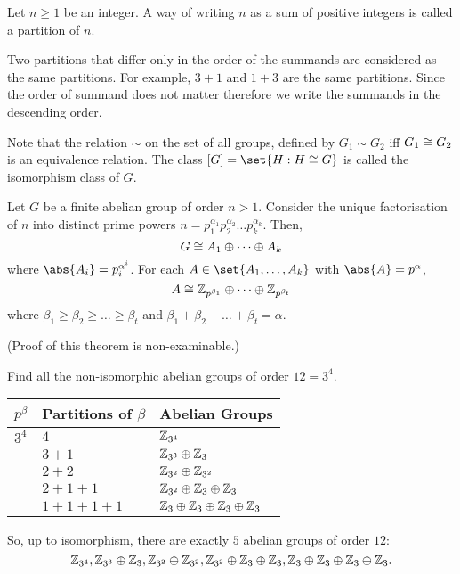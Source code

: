 \documentclass[11pt]{penrose}
\begin{document}
\begin{ndfn}
    Let $n \geq 1$ be an integer. A way of writing $n$ as a sum of positive integers is called a partition of $n$.
\end{ndfn}

Two partitions that differ only in the order of the summands are considered as the same partitions. For example, $3+1$ and $1+3$ are the same partitions. Since the order of summand does not matter therefore we write the summands in the descending order.

Note that the relation $\sim$ on the set of all groups, defined by $G_{1} \sim G_{2}$ iff $G_{1} \mathrel{\cong} G_{2}$ is an equivalence relation. The class $[G] = \set{H : H \isom G}$ is called the isomorphism class of $G$.

\begin{nthm}
    Let $G$ be a finite abelian group of order $n > 1$. Consider the unique factorisation of $n$ into distinct prime powers $n = p_{1}^{\alpha_{1}} p_{2}^{\alpha_{2}} \dots p_{k}^{\alpha_{k}}$. Then,
    \begin{equation*}
        G \mathrel{\cong} A_{1} \oplus \dots \oplus A_{k}
    \end{equation*}
    where $\abs{A_{i}} = p_{i}^{\alpha^{i}}$. For each $A \in \set{A_{1}, \dots, A_{k}}$ with $\abs{A} = p^{\alpha}$,
    \begin{equation*}
        A \mathrel{\cong} \mathbb{Z}_{p^{\beta_{1}}} \oplus \dots \oplus \mathbb{Z}_{p^{\beta_{t}}}
    \end{equation*}
    where $\beta_{1} \geq \beta_{2} \geq \dots \geq \beta_{t}$ and $\beta_{1} + \beta_{2} + \dots + \beta_{t} = \alpha$.
\end{nthm}
(Proof of this theorem is non-examinable.)

\begin{negg}
    Find all the non-isomorphic abelian groups of order $12 = 3^{4}$.
    \begin{center}
        \begin{tabularx}{0.66\textwidth}{p{8mm}XX}
            \toprule
            $p^{\beta}$ & Partitions of $\beta$ & Abelian Groups\\
            \midrule
            $3^{4}$ & $4$ & $\mathbb{Z}_{3^{4}}$ \\
                    & $3+1$ & $\mathbb{Z}_{3^{3}} \oplus \mathbb{Z}_{3}$ \\
                    & $2+2$ & $\mathbb{Z}_{3^{2}} \oplus \mathbb{Z}_{3^{2}}$ \\
                    & $2+1+1$ & $\mathbb{Z}_{3^{2}} \oplus \mathbb{Z}_{3} \oplus \mathbb{Z}_{3}$ \\
                    & $1+1+1+1$ & $\mathbb{Z}_{3} \oplus \mathbb{Z}_{3} \oplus \mathbb{Z}_{3} \oplus \mathbb{Z}_{3}$ \\
            \bottomrule
        \end{tabularx}
    \end{center}
    So, up to isomorphism, there are exactly $5$ abelian groups of order $12$:
    \begin{equation*}
        \mathbb{Z}_{3^{4}}, \mathbb{Z}_{3^{3}} \oplus \mathbb{Z}_{3}, \mathbb{Z}_{3^{2}} \oplus \mathbb{Z}_{3^{2}}, \mathbb{Z}_{3^{2}} \oplus \mathbb{Z}_{3} \oplus \mathbb{Z}_{3}, \mathbb{Z}_{3} \oplus \mathbb{Z}_{3} \oplus \mathbb{Z}_{3} \oplus \mathbb{Z}_{3}.
    \end{equation*}
\end{negg}
\end{document}

